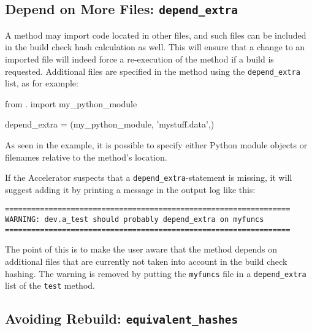 \subsection{Depend on More Files:  \texttt{depend\_extra}}
A method may import code located in other files, and such files can be
included in the build check hash calculation as well.  This will
ensure that a change to an imported file will indeed force a
re-execution of the method if a build is requested.  Additional files
are specified in the method using the \texttt{depend\_extra} list, as
for example:
\begin{python}
from . import my_python_module

depend_extra = (my_python_module, 'mystuff.data',)
\end{python}
As seen in the example, it is possible to specify either Python module
objects or filenames relative to the method's location.

If the Accelerator suspects that a \texttt{depend\_extra}-statement is
missing, it will suggest adding it by printing a message in the output
log like this:
\begin{snugshade}
\begin{verbatim}
=================================================================
WARNING: dev.a_test should probably depend_extra on myfuncs
=================================================================
\end{verbatim}
\end{snugshade}
\noindent The point of this is to make the user aware that the method
depends on additional files that are currently not taken into account
in the build check hashing.  The warning is removed by putting the
\texttt{myfuncs} file in a \texttt{depend\_extra} list of the
\texttt{test} method.


\subsection{Avoiding Rebuild: \texttt{equivalent\_hashes}}
\label{sec:equivalent_hashes}


